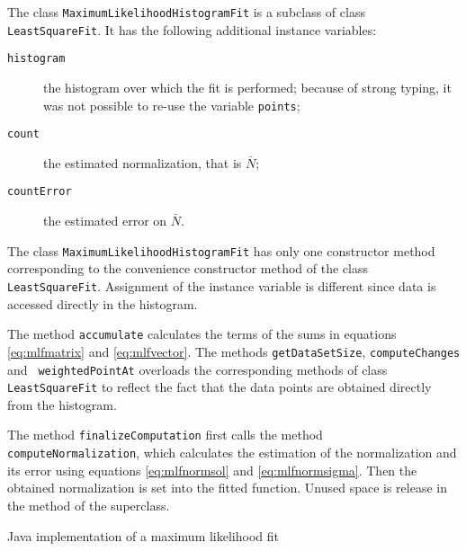 \documentclass[twoside]{book}
\begin{document}
\noindent The class {\tt MaximumLikelihoodHistogramFit} is a
subclass of class {\tt LeastSquareFit}. It has the following
additional instance variables:
\begin{description}
  \item[\tt histogram] the histogram over which the fit is
  performed; because of strong typing,
   it was not possible to re-use the variable {\tt points};
  \item[\tt count] the estimated normalization, that is $\bar{N}$;
  \item[\tt countError] the estimated error on $\bar{N}$.
\end{description}
\noindent The class {\tt MaximumLikelihoodHistogramFit} has only
one constructor method corresponding to the convenience
constructor method of the class {\tt LeastSquareFit}. Assignment
of the instance variable is different since data is accessed
directly in the histogram.

The method {\tt accumulate} calculates the terms of the sums in
equations \ref{eq:mlfmatrix} and \ref{eq:mlfvector}. The methods
{\tt getDataSetSize}, {\tt computeChanges} and {\tt
weightedPointAt} overloads the corresponding methods of class {\tt
LeastSquareFit} to reflect the fact that the data points are
obtained directly from the histogram.

The method {\tt finalizeComputation} first calls the method {\tt
computeNormalization}, which calculates the estimation of the
normalization and its error using equations \ref{eq:mlfnormsol}
and \ref{eq:mlfnormsigma}. Then the obtained normalization is set
into the fitted function. Unused space is release in the method of
the superclass.

\begin{listing} Java implementation of a maximum likelihood fit \label{lj:mlf}

\end{listing}


\ifx\wholebook\relax\else
\end{document}
